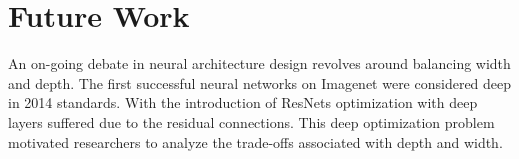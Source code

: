 \documentclass[10pt,twocolumn,letterpaper]{article}
\begin{document}









\section{Future Work}

An on-going debate in neural architecture design revolves around balancing width and depth. The first successful neural networks on Imagenet were considered deep in 2014 standards\cite{krizhevsky2012imagenet}\cite{simonyan2014very}. With the introduction of ResNets\cite{he2016deep}\cite{he2016identity} optimization with deep layers suffered due to the residual connections. This deep optimization problem motivated researchers to analyze the trade-offs associated with depth and width\cite{ding2021repvgg}\cite{huang2016deep}\cite{zagoruyko2016wide}. 
\end{document}
